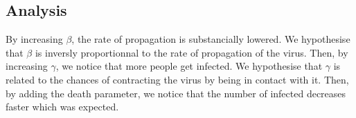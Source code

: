 \documentclass{article}
\begin{document}
\subsection{Analysis}
By increasing $\beta$, the rate of propagation is substancially lowered. We hypothesise that $\beta$ is inversly proportionnal to the rate of propagation of the virus. Then, by increasing $\gamma$, we notice that more people get infected. We hypothesise that $\gamma$ is related to the chances of contracting the virus by being in contact with it. Then, by adding the death parameter, we notice that the number of infected decreases faster which was expected.
\end{document}
